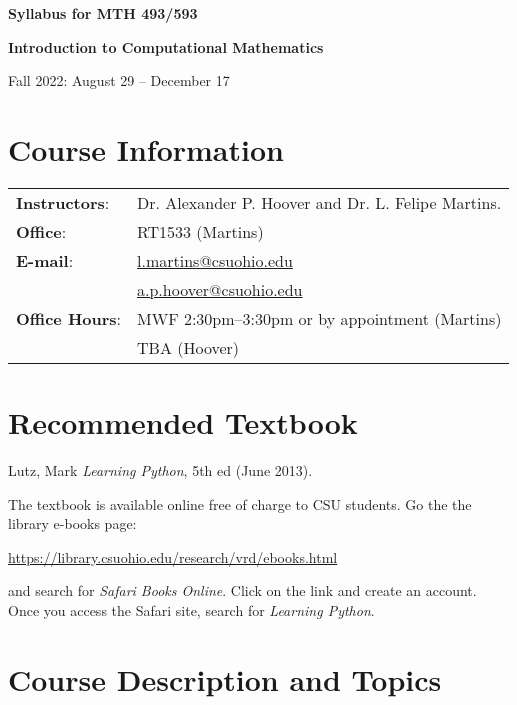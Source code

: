 \documentclass[12pt]{article}
\begin{document}
\sffamily

\begin{center}


\bigskip
{\large \textbf{Syllabus for MTH 493/593}

\textbf{Introduction to Computational Mathematics}}

Fall 2022: August 29 -- December 17
\end{center}

\section{Course Information}
\begin{tabular}{ll}
\textbf{Instructors}: & Dr. Alexander P. Hoover and Dr. L. Felipe Martins.\\
\textbf{Office}: &  RT1533 (Martins)\\
\textbf{E-mail}: &  \href{mailto:l.martins@csuohio.edu}{l.martins@csuohio.edu}\\
                 &  \href{mailto:a.p.hoover@csuohio.edu}{a.p.hoover@csuohio.edu}\\
\textbf{Office Hours}: & MWF 2:30pm--3:30pm or by appointment (Martins)\\
                       & TBA (Hoover) \\
\end{tabular}


\section{Recommended Textbook}

Lutz, Mark \emph{Learning Python}, 5th ed (June 2013).

The textbook is available online free of charge to CSU students. Go the the library e-books page:
\begin{center}
\url{https://library.csuohio.edu/research/vrd/ebooks.html}
\end{center}
and search for \emph{Safari Books Online}. Click on the link and create an account. Once you access the Safari site, search for \emph{Learning Python}.


\section{Course Description and Topics}
\end{document}
